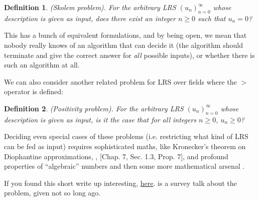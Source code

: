 \documentclass[10.8pt,oneside,reqno]{article}
\newtheorem{definition}{Definition}
\begin{document}
\begin{definition} 
    
    (Skolem problem). For the arbitrary LRS $( u_n )^{\infty} _{n=0}$ whose description is given as input, does there exist an integer $n \geq 0$ such that $u_{n} = 0$? 

\end{definition}

This has a bunch of equivalent formulations, and by being open, we mean that nobody really knows of an algorithm that can decide it (the algorithm should terminate and give the correct answer for \textit{all} possible inputs), or whether there is such an algorithm at all.

We can also consider another related problem for LRS over fields where the $>$ operator is defined:
\begin{definition} 
    (Positivity problem). For the arbitrary LRS $( u_n )^{\infty} _{n=0}$ whose description is given as input, is it the case that for all integers $n \geq 0$, $u_{n} \geq 0$?
 \end{definition}

Deciding even special cases of these problems (i.e. restricting what kind of LRS can be fed as input) requires sophisticated maths, like Kronecker’s theorem on Diophantine approximations, \cite{topology}, [Chap. 7, Sec. 1.3, Prop. 7], and profound properties of “algebraic” numbers \cite{algebra} and then some more mathematical arsenal \cite{positivity,compgeo}.

If you found this short write up interesting, \href{https://fmindia.cmi.ac.in/update2013/presentations/S-Akshay.pdf}{here}. is a survey talk about the problem, given not so long ago.

\pagebreak
\end{document}
